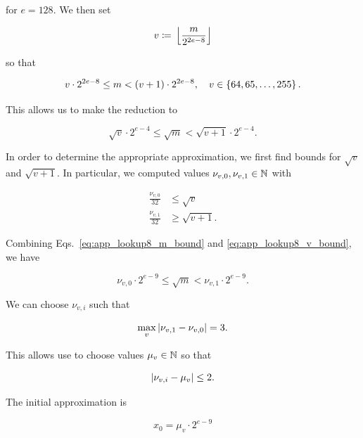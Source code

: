 \noindent
for $e = 128$.
We then set

\begin{equation}
    v \coloneqq{} \left\lfloor \frac{m}{2^{2e-8}} \right\rfloor
\end{equation}

\noindent
so that

\begin{equation}
    v\cdot2^{2e-8} \le m < \left( v+1 \right)\cdot2^{2e-8},
    \quad v\in\left\{ 64, 65, \dots, 255 \right\}.
\end{equation}

\noindent
This allows us to make the reduction to

\begin{equation}
    \sqrt{v}\cdot2^{e-4} \le \sqrt{m} < \sqrt{v+1}\cdot2^{e-4}.
    \label{eq:app_lookup8_m_bound}
\end{equation}

In order to determine the appropriate approximation,
we first find bounds for $\sqrt{v}$ and $\sqrt{v+1}$.
In particular, we computed values $\nu_{v,0}, \nu_{v,1}\in\mathbb{N}$ with

\begin{align}
    \frac{\nu_{v,0}}{32} &\le \sqrt{v} \nonumber\\
    \frac{\nu_{v,1}}{32} &\ge \sqrt{v+1}.
    \label{eq:app_lookup8_v_bound}
\end{align}

\noindent
Combining Eqs.~\eqref{eq:app_lookup8_m_bound} and
\eqref{eq:app_lookup8_v_bound},
we have

\begin{equation}
    \nu_{v,0}\cdot2^{e-9} \le \sqrt{m} < \nu_{v,1}\cdot2^{e-9}.
\end{equation}

\noindent
We can choose $\nu_{v,i}$ such that

\begin{equation}
    \max_{v} \left| \nu_{v,1} - \nu_{v,0} \right| = 3.
\end{equation}

\noindent
This allows use to choose values $\mu_{v}\in\mathbb{N}$ so that

\begin{equation}
    \left| \nu_{v,i} - \mu_{v} \right| \le 2.
\end{equation}

The initial approximation is

\begin{equation}
    x_{0} = \mu_{v}\cdot2^{e-9}
\end{equation}

